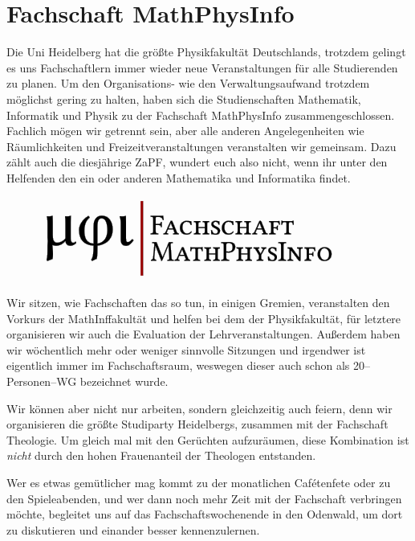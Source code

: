 
\section{Fachschaft MathPhysInfo}

Die Uni Heidelberg hat die größte Physikfakultät Deutschlands, trotzdem gelingt es uns Fachschaftlern immer wieder neue Veranstaltungen für alle Studierenden zu planen. Um den Organisations- wie den Verwaltungsaufwand trotzdem möglichst gering zu halten, haben sich die Studienschaften Mathematik, Informatik und Physik zu der Fachschaft MathPhysInfo zusammengeschlossen. Fachlich mögen wir getrennt sein, aber alle anderen Angelegenheiten wie Räumlichkeiten und Freizeitveranstaltungen veranstalten wir gemeinsam. Dazu zählt auch die diesjährige ZaPF, wundert euch also nicht, wenn ihr unter den Helfenden den ein oder anderen Mathematika und Informatika findet.
\begin{figure}
\includegraphics[width=\linewidth]{media/mathphysinfologo}
\vspace*{-20pt}
\end{figure}
Wir sitzen, wie Fachschaften das so tun, in einigen Gremien, veranstalten den Vorkurs der MathInffakultät und helfen bei dem der Physikfakultät, für letztere organisieren wir auch die Evaluation der Lehrveranstaltungen. Außerdem haben wir wöchentlich mehr oder weniger sinnvolle Sitzungen und irgendwer ist eigentlich immer im Fachschaftsraum, weswegen dieser auch schon als 20--Personen--WG bezeichnet wurde.

Wir können aber nicht nur arbeiten, sondern gleichzeitig auch feiern, denn wir organisieren die größte Studiparty Heidelbergs, zusammen mit der Fachschaft Theologie. Um gleich mal mit den Gerüchten aufzuräumen, diese Kombination ist \textit{nicht} durch den hohen Frauenanteil der Theologen entstanden.

Wer es etwas gemütlicher mag kommt zu der monatlichen Cafétenfete oder zu den Spieleabenden, und wer dann noch mehr Zeit mit der Fachschaft verbringen möchte, begleitet uns auf das Fachschaftswochenende in den Odenwald, um dort zu diskutieren und einander besser kennenzulernen.

